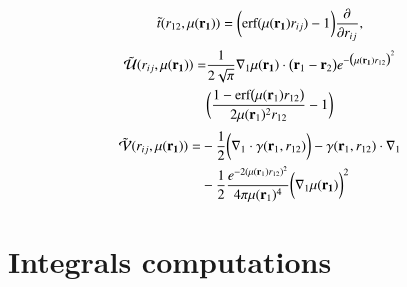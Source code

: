 \documentclass[aip,jcp,reprint,noshowkeys,superscriptaddress]{revtex4-1}
\newcommand{\deriv}[3]{\frac{\partial^{#3} #1}{\partial {#2}^{#3}}}
\newcommand{\br}[0]{{\bf {r}}}
\newcommand{\bri}[1]{{\bf r}_{#1}}
\newcommand{\mur}[1]{\mu({\bf r_{#1}})}
\begin{document}
\begin{equation}
 \begin{aligned}
 \tilde{t}(r_{12},\mur{1}) =  \bigg( \text{erf}(\mur{1} r_{ij}) - 1\bigg) \deriv{}{r_{ij}}{},
 \end{aligned}
\end{equation}
\begin{equation} 
\begin{aligned}
 \tilde{\mathcal{U}}(r_{ij},\mur{1}) = & \frac{1}{2\sqrt{\pi}}\nabla_1 \mur{1} \cdot \big(\br_1 - \br_2 \big) 
  e^{-\big( \mur{1} r_{12}\big)^2}\\ & \bigg(\frac{1 - \text{erf}\big(\mu(\bri{1}) r_{12} \big)}{2 \mu(\bri{1})^2 r_{12}} -1\bigg)
 \end{aligned}
\end{equation}
\begin{equation}
 \begin{aligned}
 \tilde{\mathcal{V}}(r_{ij},\mur{1}) = & -\frac{1}{2}\bigg( \nabla_1 \cdot \gamma(\br_1, r_{12}) \bigg) - \gamma(\br_1, r_{12}) \cdot \nabla_1 
\\ 
&- \frac{1}{2}\frac{e^{-2(\mu(\bri{1}) r_{12})^2}}{4 \pi \mu(\bri{1})^4} \bigg( \nabla_1  \mur{1}\bigg)^2
 \end{aligned}
\end{equation}

\section{Integrals computations}
\end{document}
